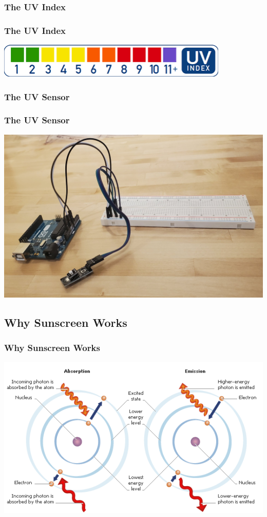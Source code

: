 \documentclass{beamer} %
\begin{document}
\subsubsection{The UV Index}
\begin{frame}\centering
  \frametitle{The UV Index}
  \includegraphics{UVIndex.png}
\end{frame}
\subsubsection{The UV Sensor}
\begin{frame}\centering
  \frametitle{The UV Sensor}
  \includegraphics[scale = 0.2]{UVSensor.jpg}
\end{frame}

\subsection{Why Sunscreen Works}
\begin{frame}\centering
  \frametitle{Why Sunscreen Works}
  \includegraphics[scale = 0.5]{Absorption.png}
\end{frame}
\end{document}
